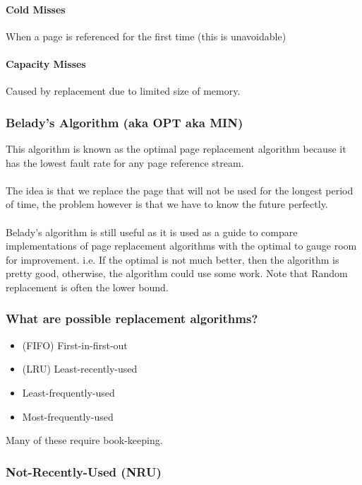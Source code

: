 \documentclass{article}
\begin{document}
\paragraph{Cold Misses} When a page is referenced for the first time (this is unavoidable)

\paragraph{Capacity Misses} Caused by replacement due to limited size of memory.

\subsubsection{Belady's Algorithm (aka OPT aka MIN)}

This algorithm is known as the optimal page replacement algorithm because it has the lowest fault rate for any page reference stream.\\
\\
The idea is that we replace the page that will not be used for the longest period of time, the problem however is that we have to know the future perfectly.
\\
\\
Belady's algorithm is still useful as it is used as a guide to compare implementations of page replacement algorithms with the optimal to gauge room for improvement. i.e. If the optimal is not much better, then the algorithm is pretty good, otherwise, the algorithm could use some work. Note that Random replacement is often the lower bound.

\subsubsection{What are possible replacement algorithms?}

\begin{itemize}
    \item (FIFO) First-in-first-out
    \item (LRU) Least-recently-used
    \item Least-frequently-used
    \item Most-frequently-used
\end{itemize}

Many of these require book-keeping.

\subsubsection{Not-Recently-Used (NRU)}
\end{document}
